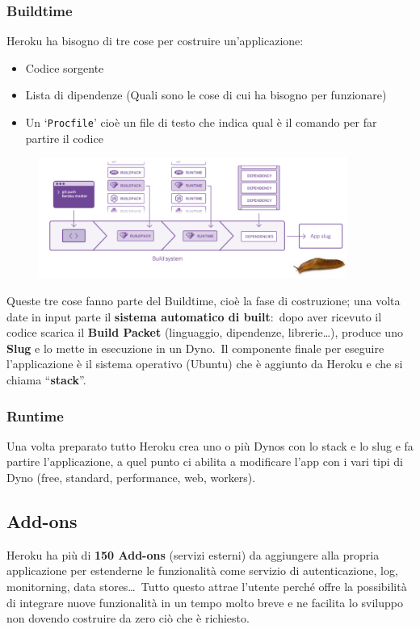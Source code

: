 \subsubsection{Buildtime}
Heroku ha bisogno di tre cose per costruire un'applicazione:

\begin{itemize}
    \item Codice sorgente
    \item Lista di dipendenze (Quali sono le cose di cui ha bisogno per funzionare)
    \item Un `\texttt{Procfile}' cioè un file di testo che indica qual è il comando per far partire il codice
\end{itemize}

\begin{figure}[H]
    \centering
    \includegraphics[width=0.9\textwidth]{immagini/Buildtime.png}
\end{figure}
\noindent Queste tre cose fanno parte del Buildtime, cioè la fase di costruzione; una volta date in input parte il \textbf{sistema automatico di built}:\ dopo aver ricevuto il codice scarica il \textbf{Build Packet} (linguaggio, dipendenze, librerie\dots), produce uno \textbf{Slug} e lo mette in esecuzione in un Dyno.\
Il componente finale per eseguire l'applicazione è il sistema operativo (Ubuntu) che è aggiunto da Heroku e che si chiama ``\textbf{stack}''.

\subsubsection{Runtime}
Una volta preparato tutto Heroku crea uno o più Dynos con lo stack e lo slug e fa partire l'applicazione, a quel punto ci abilita a modificare l'app con i vari tipi di Dyno (free, standard, performance, web, workers).

\subsection{Add-ons}
Heroku ha più di \textbf{150 Add-ons} (servizi esterni) da aggiungere alla propria applicazione per estenderne le funzionalità come servizio di autenticazione, log, monitorning, data stores\dots\
Tutto questo attrae l'utente perché offre la possibilità di integrare nuove funzionalità in un tempo molto breve e ne facilita lo sviluppo non dovendo costruire da zero ciò che è richiesto.\

